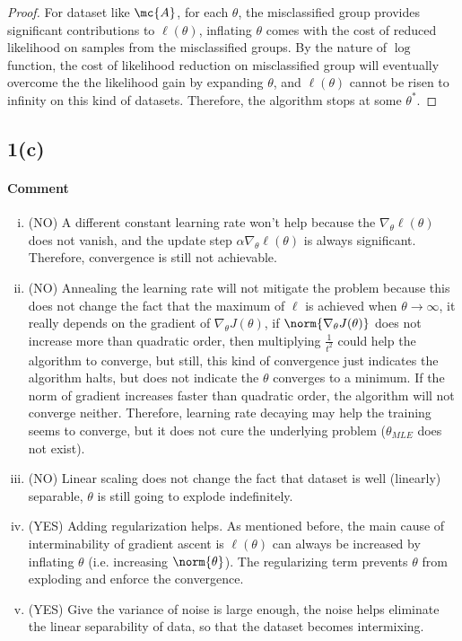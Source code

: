 \documentclass[11pt]{article}
\begin{document}
\begin{proof}
		For dataset like $\mc{A}$, for each $\theta$, the misclassified group provides significant contributions to $\ell(\theta)$, inflating $\theta$ comes with the cost of reduced likelihood on samples from the misclassified groups. By the nature of $\log$ function, the cost of likelihood reduction on misclassified group will eventually overcome the the likelihood gain by expanding $\theta$, and $\ell(\theta)$ cannot be risen to infinity on this kind of datasets. Therefore, the algorithm stops at some $\theta^*$.
	\end{proof}
	\newpage
	\subsection{1(c)}
		\paragraph{Comment}
		\begin{enumerate}[(i)]
			\item (NO) A different constant learning rate won't help because the $\nabla_\theta \ell(\theta)$ does not vanish, and the update step $\alpha \nabla_\theta \ell(\theta)$ is always significant. Therefore, convergence is still not achievable.
			\item (NO) Annealing the learning rate will not mitigate the problem because this does not change the fact that the maximum of $\ell$ is achieved when $\theta \to \infty$, it really depends on the gradient of $\nabla_\theta J(\theta)$, if $\norm{\nabla_\theta J(\theta)}$ does not increase more than quadratic order, then multiplying $\frac{1}{t^2}$ could help the algorithm to converge, but still, this kind of convergence just indicates the algorithm halts, but does not indicate the $\theta$ converges to a minimum. If the norm of gradient increases faster than quadratic order, the algorithm will not converge neither. Therefore, learning rate decaying may help the training seems to converge, but it does not cure the underlying problem ($\theta_{MLE}$ does not exist).
			\item (NO) Linear scaling does not change the fact that dataset is well (linearly) separable, $\theta$ is still going to explode indefinitely.
			\item (YES) Adding regularization helps. As mentioned before, the main cause of interminability of gradient ascent is $\ell(\theta)$ can always be increased by inflating $\theta$ (i.e. increasing $\norm{\theta}$). The regularizing term prevents $\theta$ from exploding and enforce the convergence.
			\item (YES) Give the variance of noise is large enough, the noise helps eliminate the linear separability of data, so that the dataset becomes intermixing.
		\end{enumerate}
	
\end{document}
